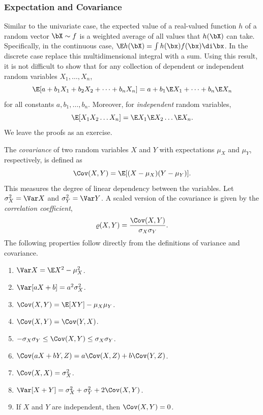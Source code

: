 \subsubsection{Expectation and Covariance}
Similar to the univariate case, the expected value of a real-valued function $h$ of a random vector $\bX \sim f$ is a weighted average of all values that $h(\bX)$ can take. Specifically, in the continuous case, $\E h(\bX) = \int h(\bx)f(\bx)\di \bx$. In the discrete case replace this multidimensional integral with a sum. Using this result, it is not difficult to show that for any collection of dependent or independent random variables $X_1, \dots, X_n$,
\begin{equation}
	\label{LinearityOfExpectation}
	\E[a + b_1 X_1 + b_2 X_2 + \dots + b_n X_n] = a + b_1 \E X_1 + \dots + b_n \E X_n
\end{equation}
for all constants $a, b_1, \dots, b_n$. Moreover, for \textit{independent} random variables,
\begin{equation}
	\label{ExpectationIndependence}
	\E[X_1 X_2 \dots X_n] = \E X_1 \E X_2 \dots \E X_n.
\end{equation}
We leave the proofs as an exercise.

The \textit{covariance} of two random variables $X$ and $Y$ with expectations $\mu_X$ and $\mu_Y$, respectively, is defined as
\begin{equation}
	\label{CovarianceDefinition}
	\Cov(X, Y) = \E[(X - \mu_X)(Y - \mu_Y)].
\end{equation}
This measures the degree of linear dependency between the variables. Let $\sigma_X^2 = \Var X$ and $\sigma_Y^2 = \Var Y$. A scaled version of the covariance is given by the \textit{correlation coefficient},
\begin{equation}
	\label{CorrelationDefinition}
	\varrho(X, Y) = \frac{\Cov(X, Y)}{\sigma_X \sigma_Y}.
\end{equation}
The following properties follow directly from the definitions of variance and covariance.

\begin{enumerate}[1.]
	\item $\Var X = \E X^2 - \mu_X^2$.
	\item $\Var[aX + b] = a^2 \sigma_X^2$.
	\item $\Cov(X, Y) = \E[XY] - \mu_X \mu_Y$.
	\item $\Cov(X, Y) = \Cov(Y, X)$.
	\item $-\sigma_X \sigma_Y \le \Cov(X, Y) \le \sigma_X \sigma_Y$.
	\item $\Cov(aX + bY, Z) = a \Cov(X, Z) + b \Cov(Y, Z)$.
	\item $\Cov(X, X) = \sigma_X^2$.
	\item $\Var[X + Y] = \sigma_X^2 + \sigma_Y^2 + 2 \Cov(X, Y)$.
	\item If $X$ and $Y$ are independent, then $\Cov(X, Y) = 0$.
\end{enumerate}

